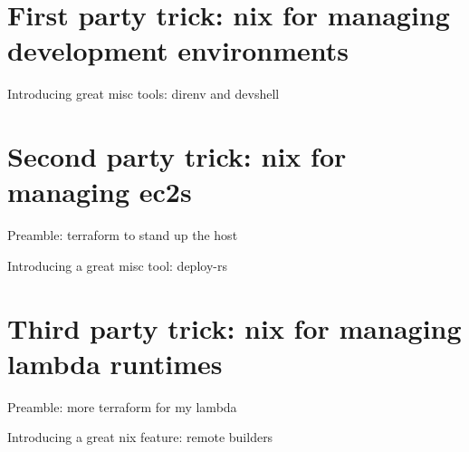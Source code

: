 \documentclass[bigger]{beamer}
\begin{document}
\section{First party trick: nix for managing development environments}
\label{sec:org0ff4895}
\begin{frame}[label={sec:org6bbd33a}]{Introducing great misc tools: direnv and devshell}
\end{frame}
\section{Second party trick: nix for managing ec2s}
\label{sec:org47308a2}
\begin{frame}[label={sec:org81281a1}]{Preamble: terraform to stand up the host}
\end{frame}
\begin{frame}[label={sec:orgea2e96d}]{Introducing a great misc tool: deploy-rs}
\end{frame}
\section{Third party trick: nix for managing lambda runtimes}
\label{sec:org91eb7a7}
\begin{frame}[label={sec:orga317e47}]{Preamble: more terraform for my lambda}
\end{frame}
\begin{frame}[label={sec:org15d80ac}]{Introducing a great nix feature: remote builders}
\end{frame}
\end{document}

